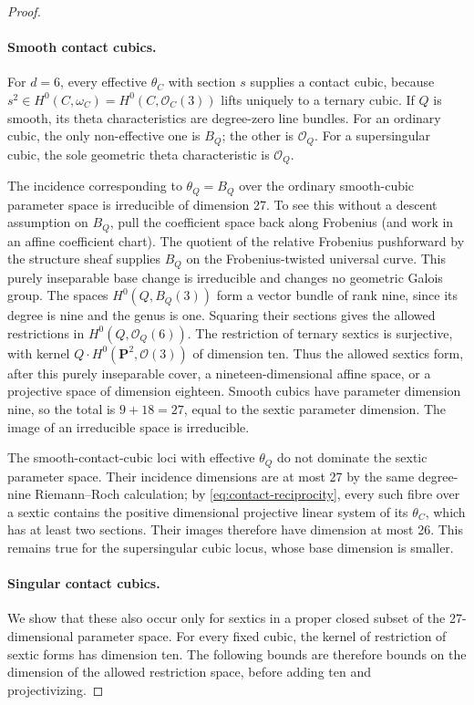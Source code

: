 \begin{proof}
\paragraph{Smooth contact cubics.}
For $d=6$, every effective $\theta_C$ with section $s$ supplies a
contact cubic, because $s^2\in H^0(C,\omega_C)=H^0(C,\mathcal O_C(3))$
lifts uniquely to a ternary cubic.
If $Q$ is smooth, its theta characteristics are degree-zero line
bundles.  For an ordinary cubic, the only non-effective one is $B_Q$;
the other is $\mathcal O_Q$.  For a supersingular cubic, the sole
geometric theta characteristic is $\mathcal O_Q$.

The incidence corresponding to $\theta_Q=B_Q$ over the ordinary
smooth-cubic parameter space is irreducible of dimension 27.
To see this without a descent assumption on $B_Q$, pull the
coefficient space back along Frobenius (and work in an affine
coefficient chart).  The quotient of the relative Frobenius pushforward
by the structure sheaf supplies $B_Q$ on the Frobenius-twisted universal
curve.  This purely inseparable base change is irreducible and changes
no geometric Galois group.  The spaces
$H^0(Q,B_Q(3))$ form a vector bundle of rank nine, since its degree is
nine and the genus is one.  Squaring their sections gives the allowed
restrictions in $H^0(Q,\mathcal O_Q(6))$.
The restriction of ternary sextics is surjective, with kernel
$Q\cdot H^0(\mathbf P^2,\mathcal O(3))$ of dimension ten.
Thus the allowed sextics form, after this purely inseparable cover,
a nineteen-dimensional affine space, or a projective space of
dimension eighteen.  Smooth cubics have parameter dimension nine,
so the total is $9+18=27$, equal to the sextic parameter dimension.
The image of an irreducible space is irreducible.

The smooth-contact-cubic loci with effective $\theta_Q$ do not
dominate the sextic parameter space.  Their incidence dimensions are
at most 27 by the same degree-nine Riemann--Roch calculation; by
\eqref{eq:contact-reciprocity}, every such fibre over a sextic contains
the positive dimensional projective linear system of its
$\theta_C$, which has at least two sections.  Their images therefore
have dimension at most 26.  This remains true for the supersingular
cubic locus, whose base dimension is smaller.

\paragraph{Singular contact cubics.}
We show that these also occur only for sextics in a proper closed
subset of the 27-dimensional parameter space.
For every fixed cubic, the kernel of restriction of sextic forms has
dimension ten.  The following bounds are therefore bounds on the
dimension of the allowed restriction space, before adding ten and
projectivizing.


\end{proof}
